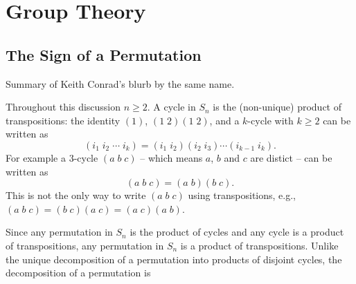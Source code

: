 \chapter{Group Theory}
\section{The Sign of a Permutation}
Summary of Keith Conrad's blurb by the same name.

Throughout this discussion $n\geq 2$. A cycle in $S_n$ is the (non-unique)
product of transpositions: the identity $(1)$, $(1\;2)(1\;2)$, and a
$k$-cycle with $k\geq 2$ can be written as
\[
(i_1\;i_2\;\cdots\;i_k)=(i_1\;i_2)(i_2\;i_3)\cdots(i_{k-1}\;i_k).
\]
For example a $3$-cycle $(a\;b\;c)$ -- which means $a$, $b$ and $c$ are
distict -- can be written as
\[
(a\;b\;c)=(a\;b)(b\;c).
\]
This is not the only way to write $(a\;b\;c)$ using transpositions, e.g.,
$(a\;b\;c)=(b\;c)(a\;c)=(a\;c)(a\;b)$.

Since any permutation in $S_n$ is the product of cycles and any cycle is a
product of transpositions, any permutation in $S_n$ is a product of
transpositions. Unlike the unique decomposition of a permutation into
products of disjoint cycles, the decomposition of a permutation is

